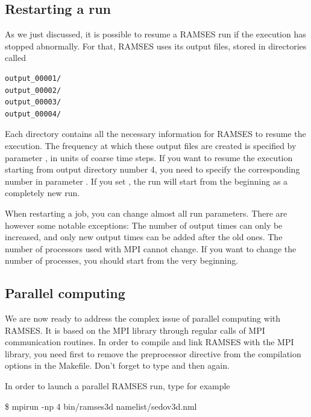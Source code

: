 \subsection{Restarting a run}

As we just discussed, it is possible to resume a RAMSES run if the
execution has stopped abnormally. For that, RAMSES uses its output
files, stored in directories called

\begin{Verbatim}
output_00001/
output_00002/
output_00003/
output_00004/
\end{Verbatim}

Each directory contains all the necessary information for RAMSES to
resume the execution. The frequency at which these output files are
created is specified by parameter , in units of coarse
time steps. If you want to resume the execution starting from output
directory number 4, you need to specify the corresponding number in
parameter . If you set
, the run will start from the beginning as a
completely new run.

\begin{warning}
When restarting a job, you can change almost all run parameters. There
are however some notable exceptions: The number of output times can only
be increased, and only new output times can be added after the old ones.
The number of processors used with MPI cannot change. If you want to
change the number of processes, you should start from the very
beginning.
\end{warning}

\subsection{Parallel computing}

We are now ready to address the complex issue of parallel computing
with RAMSES. It is based on the MPI library through regular calls of MPI
communication routines. In order to compile and link RAMSES with the MPI
library, you need first to remove the preprocessor directive
 from the compilation options in the Makefile.
Don't forget to type  and then  again.

In order to launch a parallel RAMSES run, type for example

\begin{Prompt}
\$ mpirun -np 4 bin/ramses3d namelist/sedov3d.nml
\end{Prompt}

